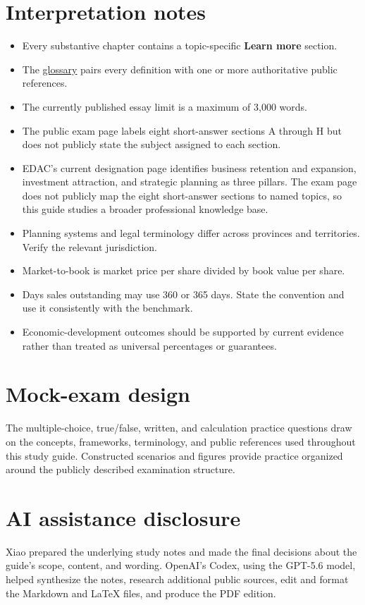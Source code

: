 \documentclass[11pt,letterpaper,oneside,openany]{book}
\newif\ifsectionhasicon
\newcommand{\currentsectionicon}{}
\newcommand{\marginsection}[2]{%
  \begingroup
  \sectionhasicontrue
  \def\currentsectionicon{#1}%
  \section[#2]{#2}%
  \endgroup
}
\begin{document}
\section[Interpretation notes]{Interpretation notes}
\begin{itemize}
\item Every substantive chapter contains a topic-specific \textbf{Learn more} section.
\item The \hyperref[chap:glossary]{glossary} pairs every definition with one or more authoritative public references.
\item The currently published essay limit is a maximum of 3,000 words.
\item The public exam page labels eight short-answer sections A through H but does not publicly state the subject assigned to each section.
\item EDAC's current designation page identifies business retention and expansion, investment attraction, and strategic planning as three pillars. The exam page does not publicly map the eight short-answer sections to named topics, so this guide studies a broader professional knowledge base.
\item Planning systems and legal terminology differ across provinces and territories. Verify the relevant jurisdiction.
\item Market-to-book is market price per share divided by book value per share.
\item Days sales outstanding may use 360 or 365 days. State the convention and use it consistently with the benchmark.
\item Economic-development outcomes should be supported by current evidence rather than treated as universal percentages or guarantees.
\end{itemize}


\section[Mock-exam design]{Mock-exam design}
The multiple-choice, true/false, written, and calculation practice questions draw on the concepts, frameworks, terminology, and public references used throughout this study guide. Constructed scenarios and figures provide practice organized around the publicly described examination structure.


\marginsection{sparkles}{AI assistance disclosure}
Xiao prepared the underlying study notes and made the final decisions about the guide's scope, content, and wording. OpenAI's Codex, using the GPT-5.6 model, helped synthesize the notes, research additional public sources, edit and format the Markdown and LaTeX files, and produce the PDF edition.
\end{document}

